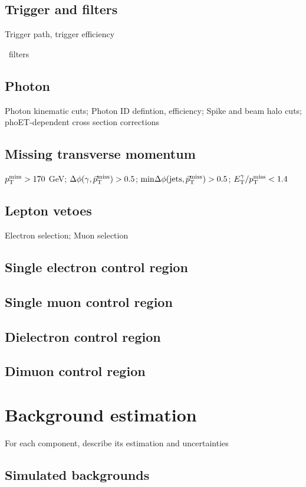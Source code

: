 \documentclass[oneside, letterpaper, 12pt, oldfontcommands]{memoir}
\begin{document}
\section{Trigger and \texorpdfstring{\MET}{pTmiss} filters} \label{sec:event_selection_trigger_METfilters}
Trigger path, trigger efficiency

\MET\ filters
\section{Photon} \label{sec:event_selection_photon}
Photon kinematic cuts; Photon ID defintion, efficiency; Spike and beam halo cuts; phoET-dependent cross section corrections
\section{Missing transverse momentum} \label{sec:event_selection_MET}
$p_\mathrm{T}^\mathrm{miss} > 170$ GeV; $\Delta\phi(\gamma,\vec{p}_\mathrm{T}^\mathrm{miss}) > 0.5$; $\mathrm{min}\Delta\phi(\mathrm{jets},\vec{p}_\mathrm{T}^\mathrm{miss}) > 0.5$;
$E_\mathrm{T}^{\gamma}/p_\mathrm{T}^\mathrm{miss} < 1.4$
\section{Lepton vetoes} \label{sec:event_selection_lepveto}
Electron selection; Muon selection
\section{Single electron control region} \label{sec:event_selection_monoele}
\section{Single muon control region} \label{sec:event_selection_monomu}
\section{Dielectron control region} \label{sec:event_selection_diele}
\section{Dimuon control region} \label{sec:event_selection_dimu}

\chapter{Background estimation} \label{chap:background_estimation}
For each component, describe its estimation and uncertainties
\section{Simulated backgrounds} \label{sec:background_estimation_simulated}
\end{document}
